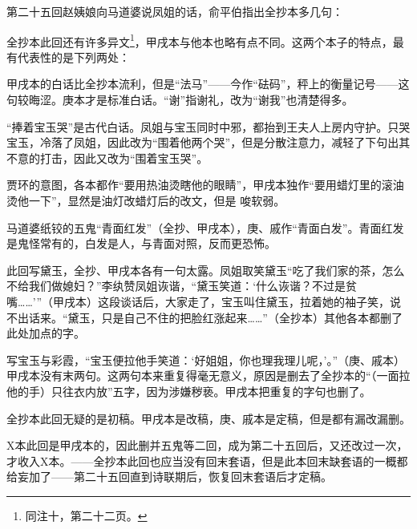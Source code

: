 \par 第二十五回赵姨娘向马道婆说凤姐的话，俞平伯指出全抄本多几句：
\par 全抄本此回还有许多异文\footnote{同注十，第二十二页。}，甲戌本与他本也略有点不同。这两个本子的特点，最有代表性的是下列两处：
\par 甲戌本的白话比全抄本流利，但是“法马”——今作“砝码”，秤上的衡量记号——这句较晦涩。庚本才是标准白话。“谢”指谢礼，改为“谢我”也清楚得多。
\par “捧着宝玉哭”是古代白话。凤姐与宝玉同时中邪，都抬到王夫人上房内守护。只哭宝玉，冷落了凤姐，因此改为“围着他两个哭”，但是分散注意力，减轻了下句出其不意的打击，因此又改为“围着宝玉哭”。
\par 贾环的意图，各本都作“要用热油烫瞎他的眼睛”，甲戌本独作“要用蜡灯里的滚油烫他一下”，显然是油灯改蜡灯后的改文，但是 唆软弱。
\par 马道婆纸铰的五鬼“青面红发”（全抄、甲戌本），庚、戚作“青面白发”。青面红发是鬼怪常有的，白发是人，与青面对照，反而更恐怖。
\par 此回写黛玉，全抄、甲戌本各有一句太露。凤姐取笑黛玉“吃了我们家的茶，怎么不给我们做媳妇？”李纨赞凤姐诙谐，“黛玉笑道：‘什么诙谐？不过是贫嘴……'”（甲戌本）这段谈话后，大家走了，宝玉叫住黛玉，拉着她的袖子笑，说不出话来。“黛玉，只是自己不住的把脸红涨起来……”（全抄本）其他各本都删了此处加点的字。
\par 写宝玉与彩霞，“宝玉便拉他手笑道：‘好姐姐，你也理我理儿呢，’。”（庚、戚本）甲戌本没有末两句。这两句本来重复得毫无意义，原因是删去了全抄本的“（一面拉他的手）只往衣内放”五字，因为涉嫌秽亵。甲戌本把重复的字句也删了。
\par 全抄本此回无疑的是初稿。甲戌本是改稿，庚、戚本是定稿，但是都有漏改漏删。
\par X本此回是甲戌本的，因此删并五鬼等二回，成为第二十五回后，又还改过一次，才收入X本。——全抄本此回也应当没有回末套语，但是此本回末缺套语的一概都给妄加了——第二十五回直到诗联期后，恢复回末套语后才定稿。
